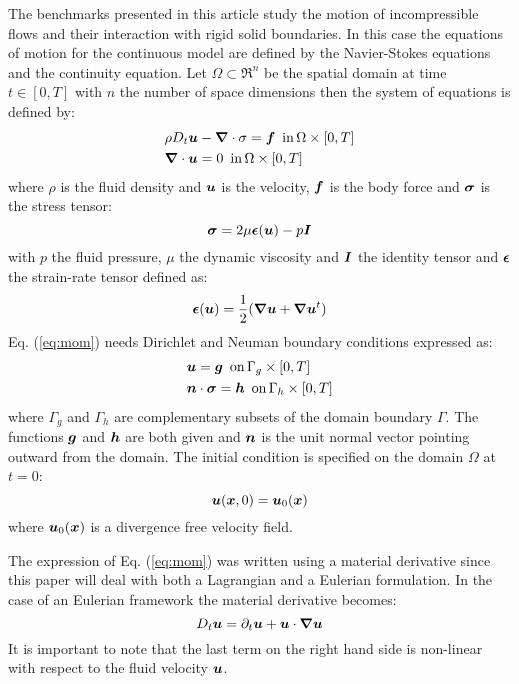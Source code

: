 The benchmarks presented in this article study the motion of incompressible flows and their interaction with rigid solid boundaries. In this case the equations of motion for the continuous model are defined by the Navier-Stokes equations and the continuity equation. Let $\Omega\subset \Re^n$ be the spatial domain at time $t\in[0,T]$ with $n$ the number of space dimensions then the system of equations is defined by:
%
\begin{eqnarray}
&\rho D_t\boldsymbol{u}-\boldsymbol{\nabla}\cdot\sigma=\boldsymbol{f} \,\,\, \text{in}\, \Omega\times[0,T] \label{eq:mom}\\
&\boldsymbol{\nabla}\cdot \boldsymbol{u}=0 \label{eq:cont} \,\,\, \text{in}\, \Omega\times[0,T] 
\end{eqnarray}
%
where $\rho$ is the fluid density and $\boldsymbol{u}$ is the velocity, $\boldsymbol{f}$ is the body force and $\boldsymbol{\sigma}$ is the stress tensor:
%
\begin{equation}
\boldsymbol{\sigma}=2\mu\boldsymbol{\epsilon}(\boldsymbol{u})-p\boldsymbol{I}
\end{equation}
%
with $p$ the fluid pressure, $\mu$ the dynamic viscosity and $\boldsymbol{I}$ the identity tensor and $\boldsymbol{\epsilon}$ the strain-rate tensor defined as:
%
\begin{equation}
  \boldsymbol{\epsilon}(\boldsymbol{u})=\frac{1}{2}(\boldsymbol{\nabla}\boldsymbol{u}+\boldsymbol{\nabla}\boldsymbol{u}^t)
\end{equation}
%
Eq. (\ref{eq:mom}) needs Dirichlet and Neuman boundary conditions expressed as:
%
\begin{eqnarray}
  &\boldsymbol{u}=\boldsymbol{g} \,\,\, \text{on}\, \Gamma_g\times[0,T]\\   
  &\boldsymbol{n}\cdot\boldsymbol{\sigma}=\boldsymbol{h} \,\,\, \text{on}\, \Gamma_h\times[0,T]
\end{eqnarray}
%
where $\Gamma_g$ and $\Gamma_h$ are complementary subsets of the domain boundary $\Gamma$. The functions $\boldsymbol{g}$ and $\boldsymbol{h}$ are both given and $\boldsymbol{n}$ is the unit normal vector pointing outward from the domain.
The initial condition is specified on the domain $\Omega$ at $t=0$:
%
\begin{equation}
  \boldsymbol{u}(\boldsymbol{x},0)=\boldsymbol{u}_0(\boldsymbol{x})
\end{equation}
%
where $\boldsymbol{u}_0(\boldsymbol{x})$ is a divergence free velocity field.

The expression of Eq. (\ref{eq:mom}) was written using a material derivative since this paper will deal with both a Lagrangian and a Eulerian formulation. In the case of an Eulerian framework the material derivative becomes:
\begin{equation}
D_t\boldsymbol{u}=\partial_t\boldsymbol{u}+\boldsymbol{u} \cdot \boldsymbol{\nabla}\boldsymbol{u}  
\end{equation}
It is important to note that the last term on the right hand side is non-linear with respect to the fluid velocity $\boldsymbol{u}$.
